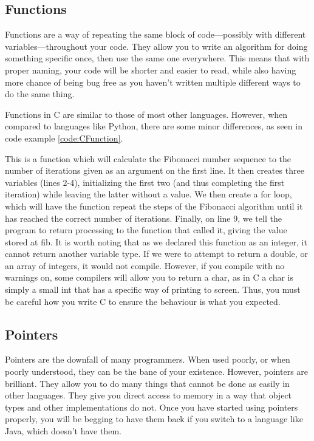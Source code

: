 			\begin{code}
				C}]{./CSwitch.c}
				\caption{Example of the C Switch Statement}
				\label{code:CSwitch}
			\end{code}
		\subsection{Functions}
			Functions are a way of repeating the same block of code---possibly with different variables---throughout your code. 
			They allow you to write an algorithm for doing something specific once, then use the same one everywhere. 
			This means that with proper naming, your code will be shorter and easier to read, while also having more chance of being bug free as you haven't written multiple different ways to do the same thing. 

			Functions in C are similar to those of most other languages. 
			However, when compared to languages like Python, there are some minor differences, as seen in code example \ref{code:CFunction}.
			\begin{code}
				C}]{./CFunction.c}
				\caption{Example of a C Function}
				\label{code:CFunction}
			\end{code}
			This is a function which will calculate the Fibonacci number sequence to the number of iterations given as an argument on the first line. 
			It then creates three variables (lines 2-4), initializing the first two (and thus completing the first iteration) while leaving the latter without a value. 
			We then create a for loop, which will have the function repeat the steps of the Fibonacci algorithm until it has reached the correct number of iterations. 
			Finally, on line 9, we tell the program to return processing to the function that called it, giving the value stored at fib. 
			It is worth noting that as we declared this function as an integer, it cannot return another variable type. 
			If we were to attempt to return a double, or an array of integers, it would not compile. 
			However, if you compile with no warnings on, some compilers will allow you to return a char, as in C a char is simply a small int that has a specific way of printing to screen. 
			Thus, you must be careful how you write C to ensure the behaviour is what you expected. 

		\subsection{Pointers}
			Pointers are the downfall of many programmers. 
			When used poorly, or when poorly understood, they can be the bane of your existence. 
			However, pointers are brilliant. 
			They allow you to do many things that cannot be done as easily in other languages. 
			They give you direct access to memory in a way that object types and other implementations do not. 
			Once you have started using pointers properly, you will be begging to have them back if you switch to a language like Java, which doesn't have them. 


